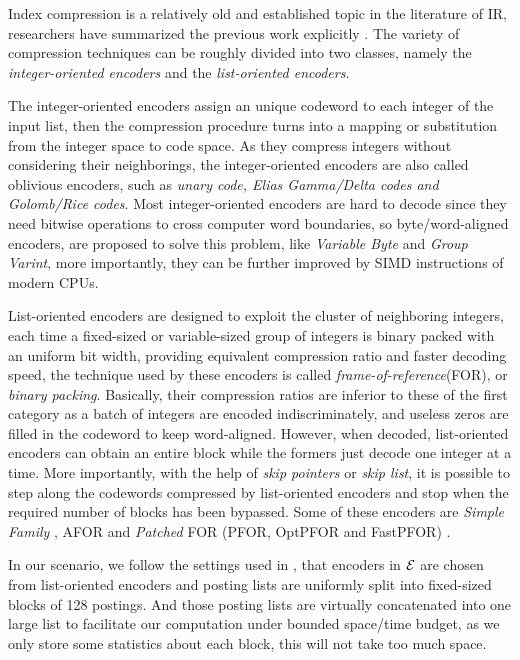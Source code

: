 \documentclass{sig-alternate-05-2015}
\begin{document}
Index compression is a relatively old and established topic in the literature of IR, researchers have summarized the previous work explicitly \cite{catena2014inverted,lemire2015decoding,silvestri2010vsencoding,trotman2014compression}.
The variety of compression techniques can be roughly divided into two classes, namely the \textit{integer-oriented encoders} and the \textit{list-oriented encoders}.

The integer-oriented encoders assign an unique codeword to each integer of the input list, then the compression procedure turns into a mapping or substitution from the integer space to code space.
As they compress integers without considering their neighborings, the integer-oriented encoders are also called oblivious encoders\cite{catena2014inverted}, such as \textit{unary code, Elias Gamma/Delta codes \emph{and} Golomb/Rice codes}.
Most integer-oriented encoders are hard to decode since they need bitwise operations to cross computer word boundaries, so byte/word-aligned encoders, are proposed to solve this problem, like \textit{Variable Byte} and \textit{Group Varint}, more importantly, they can be further improved by SIMD instructions of modern CPUs\cite{stepanov2011simd,trotman2014compression}.

List-oriented encoders are designed to exploit the cluster of neighboring integers, each time a fixed-sized or variable-sized group of integers is binary packed with an uniform bit width, providing equivalent compression ratio and faster decoding speed, the technique used by these encoders is called \textit{frame-of-reference}(FOR), or \textit{binary packing}\cite{delbru2010adaptive,goldstein1998compressing}.
Basically, their compression ratios are inferior to these of the first category as a batch of integers are encoded indiscriminately, and useless zeros are filled in the codeword to keep word-aligned.
However, when decoded, list-oriented encoders can obtain an entire block while the formers just decode one integer at a time.
More importantly, with the help of \textit{skip pointers} or \textit{skip list}, it is possible to step along the codewords compressed by list-oriented encoders and stop when the required number of blocks has been bypassed.
Some of these encoders are \textit{Simple Family} \cite{anh2004index,anh2005inverted,anh2006improved,anh2010index}, AFOR \cite{delbru2012searching} and \textit{Patched} FOR (PFOR, OptPFOR and FastPFOR) \cite{lemire2015decoding,yan2009inverted,zukowski2006super}.

In our scenario, we follow the settings used in \cite{ottaviano2015optimal}, that encoders in $ \cal E $ are chosen from list-oriented encoders and posting lists are uniformly split into fixed-sized blocks of 128 postings.
And those posting lists are virtually concatenated into one large list to facilitate our computation under bounded space/time budget, as we only store some statistics about each block, this will not take too much space.
\end{document}
